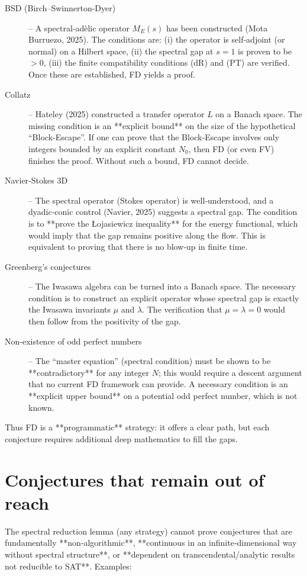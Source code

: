 \documentclass[11pt,a4paper]{article}
\begin{document}
\begin{description}
\item[BSD (Birch–Swinnerton-Dyer)] – A spectral‑adèlic operator $M_E(s)$ has been constructed (Mota Burruezo, 2025). The conditions are: (i) the operator is self‑adjoint (or normal) on a Hilbert space, (ii) the spectral gap at $s=1$ is proven to be $>0$, (iii) the finite compatibility conditions (dR) and (PT) are verified. Once these are established, FD yields a proof.
\item[Collatz] – Hateley (2025) constructed a transfer operator $L$ on a Banach space. The missing condition is an **explicit bound** on the size of the hypothetical “Block‑Escape”. If one can prove that the Block‑Escape involves only integers bounded by an explicit constant $N_0$, then FD (or even FV) finishes the proof. Without such a bound, FD cannot decide.
\item[Navier‑Stokes 3D] – The spectral operator (Stokes operator) is well‑understood, and a dyadic‑conic control (Navier, 2025) suggests a spectral gap. The condition is to **prove the Łojasiewicz inequality** for the energy functional, which would imply that the gap remains positive along the flow. This is equivalent to proving that there is no blow‑up in finite time.
\item[Greenberg’s conjectures] – The Iwasawa algebra can be turned into a Banach space. The necessary condition is to construct an explicit operator whose spectral gap is exactly the Iwasawa invariants $\mu$ and $\lambda$. The verification that $\mu=\lambda=0$ would then follow from the positivity of the gap.
\item[Non‑existence of odd perfect numbers] – The “master equation” (spectral condition) must be shown to be **contradictory** for any integer $N$; this would require a descent argument that no current FD framework can provide. A necessary condition is an **explicit upper bound** on a potential odd perfect number, which is not known.
\end{description}

Thus FD is a **programmatic** strategy: it offers a clear path, but each conjecture requires additional deep mathematics to fill the gaps.

\section{Conjectures that remain out of reach}

The spectral reduction lemma (any strategy) cannot prove conjectures that are fundamentally **non‑algorithmic**, **continuous in an infinite‑dimensional way without spectral structure**, or **dependent on transcendental/analytic results not reducible to SAT**. Examples:
\end{document}
